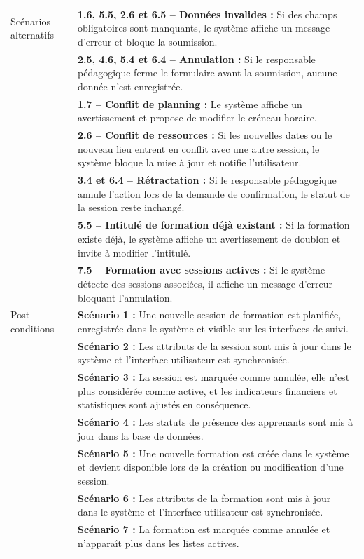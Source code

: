 {\begin{longtable}{|l|p{12cm}|}
Scénarios alternatifs &
\textbf{1.6, 5.5, 2.6 et 6.5 -- Données invalides :} Si des champs obligatoires sont manquants, le système affiche un message d'erreur et bloque la soumission. \\
& \textbf{2.5, 4.6, 5.4 et 6.4 -- Annulation :} Si le responsable pédagogique ferme le formulaire avant la soumission, aucune donnée n'est enregistrée. \\
& \textbf{1.7 -- Conflit de planning :} Le système affiche un avertissement et propose de modifier le créneau horaire. \\
& \textbf{2.6 -- Conflit de ressources :} Si les nouvelles dates ou le nouveau lieu entrent en conflit avec une autre session, le système bloque la mise à jour et notifie l'utilisateur. \\
& \textbf{3.4 et 6.4 -- Rétractation :} Si le responsable pédagogique annule l'action lors de la demande de confirmation, le statut de la session reste inchangé. \\
& \textbf{5.5 -- Intitulé de formation déjà existant :} Si la formation existe déjà, le système affiche un avertissement de doublon et invite à modifier l'intitulé. \\
& \textbf{7.5 -- Formation avec sessions actives :} Si le système détecte des sessions associées, il affiche un message d'erreur bloquant l'annulation. \\
\hline

Post-conditions &
\textbf{Scénario 1 :} Une nouvelle session de formation est planifiée, enregistrée dans le système et visible sur les interfaces de suivi. \\
& \textbf{Scénario 2 :} Les attributs de la session sont mis à jour dans le système et l'interface utilisateur est synchronisée. \\
& \textbf{Scénario 3 :} La session est marquée comme annulée, elle n'est plus considérée comme active, et les indicateurs financiers et statistiques sont ajustés en conséquence. \\
& \textbf{Scénario 4 :} Les statuts de présence des apprenants sont mis à jour dans la base de données. \\
& \textbf{Scénario 5 :} Une nouvelle formation est créée dans le système et devient disponible lors de la création ou modification d'une session. \\
& \textbf{Scénario 6 :} Les attributs de la formation sont mis à jour dans le système et l'interface utilisateur est synchronisée. \\
& \textbf{Scénario 7 :} La formation est marquée comme annulée et n'apparaît plus dans les listes actives. \\
\hline
\end{longtable}
}

